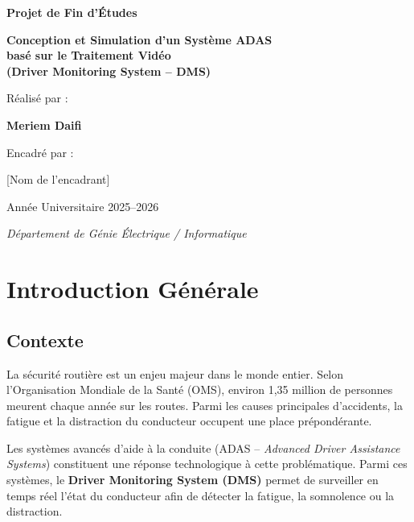 \documentclass[12pt,a4paper]{report}
\begin{document}
\begin{titlepage}
    \centering
    \vspace*{2cm}
    {\LARGE\bfseries Projet de Fin d'Études\par}
    \vspace{1.5cm}
    {\Huge\bfseries Conception et Simulation d'un Système ADAS\\
    basé sur le Traitement Vidéo\\[0.5cm]
    (Driver Monitoring System -- DMS)\par}
    \vspace{2cm}
    {\Large Réalisé par :\par}
    {\Large\bfseries Meriem Daifi\par}
    \vspace{1.5cm}
    {\Large Encadré par :\par}
    {\Large [Nom de l'encadrant]\par}
    \vspace{2cm}
    {\large Année Universitaire 2025--2026\par}
    \vfill
    {\large\itshape Département de Génie Électrique / Informatique\par}
\end{titlepage}

\tableofcontents
\newpage
\listoffigures
\newpage
\listoftables
\newpage

\chapter{Introduction Générale}

\section{Contexte}

La sécurité routière est un enjeu majeur dans le monde entier. Selon l'Organisation Mondiale de la Santé (OMS), environ 1,35 million de personnes meurent chaque année sur les routes. Parmi les causes principales d'accidents, la fatigue et la distraction du conducteur occupent une place prépondérante.

Les systèmes avancés d'aide à la conduite (ADAS -- \textit{Advanced Driver Assistance Systems}) constituent une réponse technologique à cette problématique. Parmi ces systèmes, le \textbf{Driver Monitoring System (DMS)} permet de surveiller en temps réel l'état du conducteur afin de détecter la fatigue, la somnolence ou la distraction.
\end{document}
